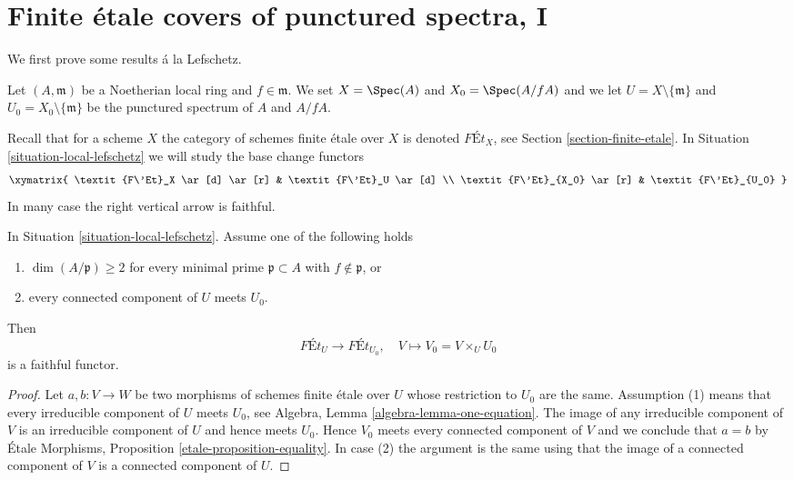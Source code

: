 \section{Finite \'etale covers of punctured spectra, I}
\label{section-pi1-punctured-spec}

\noindent
We first prove some results \'a la Lefschetz.

\begin{situation}
\label{situation-local-lefschetz}
Let $(A, \mathfrak m)$ be a Noetherian local ring and $f \in \mathfrak m$.
We set $X = \Spec(A)$ and $X_0 = \Spec(A/fA)$ and we
let $U = X \setminus \{\mathfrak m\}$ and
$U_0 = X_0 \setminus \{\mathfrak m\}$ be the punctured spectrum of
$A$ and $A/fA$.
\end{situation}

\noindent
Recall that for a scheme $X$ the category of schemes finite
\'etale over $X$ is denoted $\textit{F\'Et}_X$, see
Section \ref{section-finite-etale}.
In Situation \ref{situation-local-lefschetz}
we will study the base change functors
$$
\xymatrix{
\textit{F\'Et}_X \ar[d] \ar[r] & \textit{F\'Et}_U \ar[d] \\
\textit{F\'Et}_{X_0} \ar[r] & \textit{F\'Et}_{U_0}
}
$$
In many case the right vertical arrow is faithful.

\begin{lemma}
\label{lemma-faithful}
In Situation \ref{situation-local-lefschetz}.
Assume one of the following holds
\begin{enumerate}
\item $\dim(A/\mathfrak p) \geq 2$ for every minimal prime
$\mathfrak p \subset A$ with $f \not \in \mathfrak p$, or
\item every connected component of $U$ meets $U_0$.
\end{enumerate}
Then
$$
\textit{F\'Et}_U \longrightarrow \textit{F\'Et}_{U_0},\quad
V \longmapsto V_0 = V \times_U U_0
$$
is a faithful functor.
\end{lemma}

\begin{proof}
Let $a, b : V \to W$ be two morphisms of schemes finite \'etale over $U$
whose restriction to $U_0$ are the same. Assumption (1)
means that every irreducible component of $U$ meets $U_0$, see
Algebra, Lemma \ref{algebra-lemma-one-equation}.
The image of any irreducible component of $V$ is an
irreducible component of $U$ and hence meets $U_0$.
Hence $V_0$ meets every connected component of $V$ and
we conclude that $a = b$ by \'Etale Morphisms, Proposition
\ref{etale-proposition-equality}.
In case (2) the argument is the same using that the image
of a connected component of $V$ is a connected component of $U$.
\end{proof}

